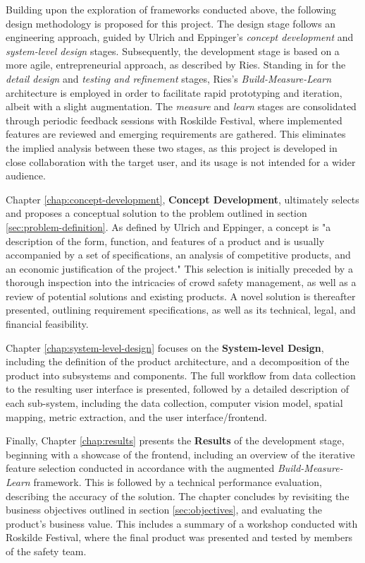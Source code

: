 Building upon the exploration of frameworks conducted above, the following design methodology is proposed for this project. The design stage follows an engineering approach, guided by Ulrich and Eppinger's \textit{concept development} and \textit{system-level design} stages. Subsequently, the development stage is based on a more agile, entrepreneurial approach, as described by Ries. Standing in for the \textit{detail design} and \textit{testing and refinement} stages, Ries's \textit{Build-Measure-Learn} architecture is employed in order to facilitate rapid prototyping and iteration, albeit with a slight augmentation. The \textit{measure} and \textit{learn} stages are consolidated through periodic feedback sessions with Roskilde Festival, where implemented features are reviewed and emerging requirements are gathered. This eliminates the implied analysis between these two stages, as this project is developed in close collaboration with the target user, and its usage is not intended for a wider audience.

Chapter \ref{chap:concept-development}, \textbf{Concept Development}, ultimately selects and proposes a conceptual solution to the problem outlined in section \ref{sec:problem-definition}. As defined by Ulrich and Eppinger, a concept is "a description of the form, function, and features of a product and is usually accompanied by a set of specifications, an analysis of competitive products, and an economic justification of the project." \cite{ulrich_eppinger} This selection is initially preceded by a thorough inspection into the intricacies of crowd safety management, as well as a review of potential solutions and existing products. A novel solution is thereafter presented, outlining requirement specifications, as well as its technical, legal, and financial feasibility.

Chapter \ref{chap:system-level-design} focuses on the \textbf{System-level Design}, including the definition of the product architecture, and a decomposition of the product into subsystems and components. The full workflow from data collection to the resulting user interface is presented, followed by a detailed description of each sub-system, including the data collection, computer vision model, spatial mapping, metric extraction, and the user interface/frontend.

Finally, Chapter \ref{chap:results} presents the \textbf{Results} of the development stage, beginning with a showcase of the frontend, including an overview of the iterative feature selection conducted in accordance with the augmented \textit{Build-Measure-Learn} framework. This is followed by a technical performance evaluation, describing the accuracy of the solution. The chapter concludes by revisiting the business objectives outlined in section \ref{sec:objectives}, and evaluating the product's business value. This includes a summary of a workshop conducted with Roskilde Festival, where the final product was presented and tested by members of the safety team.